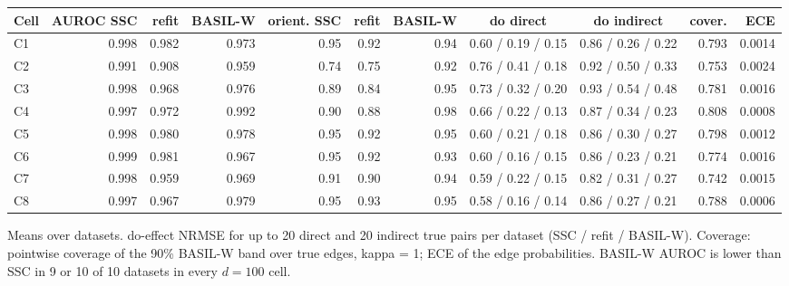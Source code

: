 \begin{adjustbox}{max width=\textwidth}
\begin{tabular}{lrrrrrrccrr}
\toprule
Cell & AUROC SSC & refit & BASIL-W & orient. SSC & refit & BASIL-W & do direct & do indirect & cover. & ECE \\
\midrule
C1 & 0.998 & 0.982 & 0.973 & 0.95 & 0.92 & 0.94 & 0.60 / 0.19 / 0.15 & 0.86 / 0.26 / 0.22 & 0.793 & 0.0014 \\
C2 & 0.991 & 0.908 & 0.959 & 0.74 & 0.75 & 0.92 & 0.76 / 0.41 / 0.18 & 0.92 / 0.50 / 0.33 & 0.753 & 0.0024 \\
C3 & 0.998 & 0.968 & 0.976 & 0.89 & 0.84 & 0.95 & 0.73 / 0.32 / 0.20 & 0.93 / 0.54 / 0.48 & 0.781 & 0.0016 \\
C4 & 0.997 & 0.972 & 0.992 & 0.90 & 0.88 & 0.98 & 0.66 / 0.22 / 0.13 & 0.87 / 0.34 / 0.23 & 0.808 & 0.0008 \\
C5 & 0.998 & 0.980 & 0.978 & 0.95 & 0.92 & 0.95 & 0.60 / 0.21 / 0.18 & 0.86 / 0.30 / 0.27 & 0.798 & 0.0012 \\
C6 & 0.999 & 0.981 & 0.967 & 0.95 & 0.92 & 0.93 & 0.60 / 0.16 / 0.15 & 0.86 / 0.23 / 0.21 & 0.774 & 0.0016 \\
C7 & 0.998 & 0.959 & 0.969 & 0.91 & 0.90 & 0.94 & 0.59 / 0.22 / 0.15 & 0.82 / 0.31 / 0.27 & 0.742 & 0.0015 \\
C8 & 0.997 & 0.967 & 0.979 & 0.95 & 0.93 & 0.95 & 0.58 / 0.16 / 0.14 & 0.86 / 0.27 / 0.21 & 0.788 & 0.0006 \\
\bottomrule
\end{tabular}
\end{adjustbox}

\smallskip
{\footnotesize Means over datasets. do-effect NRMSE for up to 20 direct and 20 indirect true pairs per dataset (SSC / refit / BASIL-W). Coverage: pointwise coverage of the 90\% BASIL-W band over true edges, kappa = 1; ECE of the edge probabilities. BASIL-W AUROC is lower than SSC in 9 or 10 of 10 datasets in every $d=100$ cell.}
